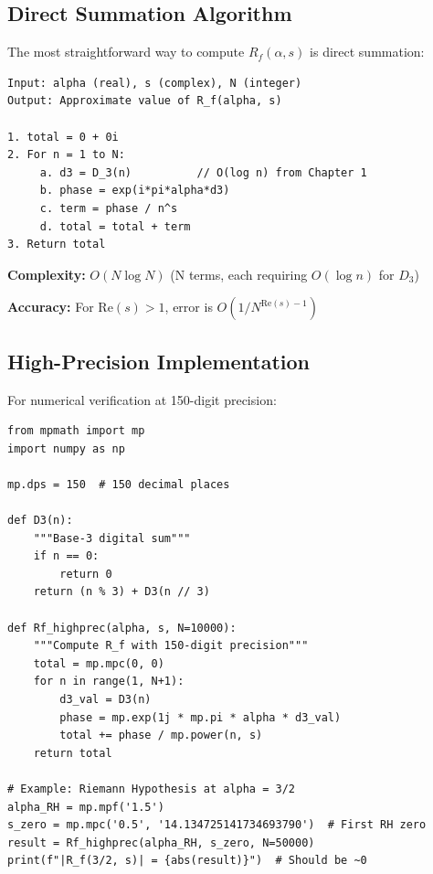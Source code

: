 \subsection{Direct Summation Algorithm}

The most straightforward way to compute $R_f(\alpha, s)$ is direct summation:

\begin{algorithm}[H]
\caption{Direct Summation}
\begin{verbatim}
Input: alpha (real), s (complex), N (integer)
Output: Approximate value of R_f(alpha, s)

1. total = 0 + 0i
2. For n = 1 to N:
     a. d3 = D_3(n)          // O(log n) from Chapter 1
     b. phase = exp(i*pi*alpha*d3)
     c. term = phase / n^s
     d. total = total + term
3. Return total
\end{verbatim}
\end{algorithm}

\textbf{Complexity:} $O(N \log N)$ (N terms, each requiring $O(\log n)$ for $D_3$)

\textbf{Accuracy:} For $\text{Re}(s) > 1$, error is $O(1/N^{\text{Re}(s)-1})$

\subsection{High-Precision Implementation}

For numerical verification at 150-digit precision:

\begin{example}
\begin{verbatim}
from mpmath import mp
import numpy as np

mp.dps = 150  # 150 decimal places

def D3(n):
    """Base-3 digital sum"""
    if n == 0:
        return 0
    return (n % 3) + D3(n // 3)

def Rf_highprec(alpha, s, N=10000):
    """Compute R_f with 150-digit precision"""
    total = mp.mpc(0, 0)
    for n in range(1, N+1):
        d3_val = D3(n)
        phase = mp.exp(1j * mp.pi * alpha * d3_val)
        total += phase / mp.power(n, s)
    return total

# Example: Riemann Hypothesis at alpha = 3/2
alpha_RH = mp.mpf('1.5')
s_zero = mp.mpc('0.5', '14.134725141734693790')  # First RH zero
result = Rf_highprec(alpha_RH, s_zero, N=50000)
print(f"|R_f(3/2, s)| = {abs(result)}")  # Should be ~0
\end{verbatim}
\end{example}

